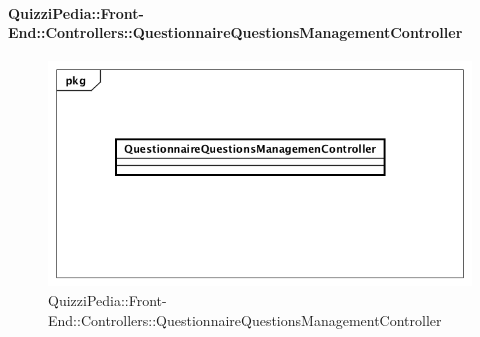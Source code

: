 \paragraph{QuizziPedia::Front-End::Controllers::QuestionnaireQuestionsManagementController}
\begin{figure} [ht]
	\centering
	\includegraphics[scale=0.45]{UML/Classi/Front-End/QuizziPedia_Front-end_Controller_QuestionnaireQuestionsManagementController.png}
	\caption{QuizziPedia::Front-End::Controllers::QuestionnaireQuestionsManagementController}
\end{figure} \FloatBarrier
